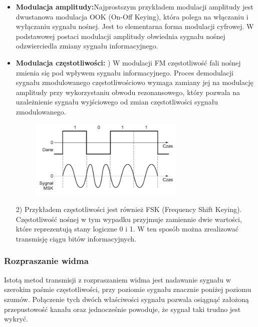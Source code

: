 \documentclass[a4paper,titleauthor]{mwart}
\begin{document}
\begin{itemize}
\item \textbf{Modulacja amplitudy:}\newline \newline Najprostszym przykładem modulacji amplitudy jest dwustanowa modulacja OOK (On-Off Keying), która polega na włączaniu i wyłączaniu sygnału nośnej. Jest to elementarna forma modulacji cyfrowej. W podstawowej postaci modulacji amplitudy obwiednia sygnału nośnej odzwierciedla zmiany sygnału informacyjnego. \newline \newline
\item \textbf{Modulacja częstotliwości:} \newline {})	W modulacji FM częstotliwość fali nośnej zmienia się pod wpływem sygnału informacyjnego. Proces demodulacji sygnału zmodulowanego częstotliwościowo wymaga zamiany jej na modulację amplitudy przy wykorzystaniu obwodu rezonansowego, który pozwala na uzależnienie sygnału wyjściowego od zmian częstotliwości sygnału zmodulowanego. 

\begin{figure}[h]
	\centering
	\includegraphics[width=0.7\textwidth]{modulacja1.jpg}
\end{figure}

2)	Przykładem częstotliwości jest również FSK (Frequency Shift Keying). Częstotliwość nośnej w tym wypadku przyjmuje zamiennie dwie wartości, które reprezentują stany logiczne 0 i 1. W ten sposób można zrealizować transmisję ciągu bitów informacyjnych. 
\end{itemize}

\subsubsection{Rozpraszanie widma}
Istotą metod transmisji z rozpraszaniem widma jest nadawanie sygnału w szerokim paśmie częstotliwości, przy poziomie sygnału znacznie poniżej poziomu szumów. \newline \newline
Połączenie tych dwóch właściwości sygnału pozwala osiągnąć założoną przepustowość kanału oraz jednocześnie powoduje, że sygnał taki trudno jest wykryć. 
\end{document}
